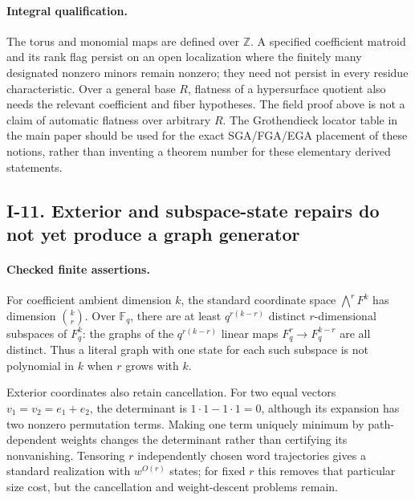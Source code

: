 \documentclass[11pt,a4paper]{article}
\theoremstyle{definition}\newtheorem{definition}{Definition}
\begin{document}
\paragraph{Integral qualification.}
The torus and monomial maps are defined over $\mathbb Z$.
A specified coefficient matroid and its rank flag persist on an
open localization where the finitely many designated nonzero
minors remain nonzero; they need not persist in every residue
characteristic.  Over a general base $R$, flatness of a
hypersurface quotient also needs the relevant coefficient and
fiber hypotheses.  The field proof above is not a claim of
automatic flatness over arbitrary $R$.  The Grothendieck locator
table in the main paper should be used for the exact SGA/FGA/EGA
placement of these notions, rather than inventing a theorem
number for these elementary derived statements.

\subsection{I-11. Exterior and subspace-state repairs do not yet produce a graph generator}
\label{I-11}

\paragraph{Checked finite assertions.}
For coefficient ambient dimension $k$, the standard coordinate
space $\bigwedge^rF^k$ has dimension $\binom kr$.  Over
$\mathbb F_q$, there are at least $q^{r(k-r)}$ distinct
$r$-dimensional subspaces of $F_q^k$: the graphs of the
$q^{r(k-r)}$ linear maps $F_q^r\to F_q^{k-r}$ are all distinct.
Thus a literal graph with one state for each such subspace is
not polynomial in $k$ when $r$ grows with $k$.

Exterior coordinates also retain cancellation.  For two equal
vectors $v_1=v_2=e_1+e_2$, the determinant is
$1\cdot1-1\cdot1=0$, although its expansion has two nonzero
permutation terms.  Making one term uniquely minimum by
path-dependent weights changes the determinant rather than
certifying its nonvanishing.  Tensoring $r$ independently chosen
word trajectories gives a standard realization with $w^{O(r)}$
states; for fixed $r$ this removes that particular size cost,
but the cancellation and weight-descent problems remain.
\end{document}
